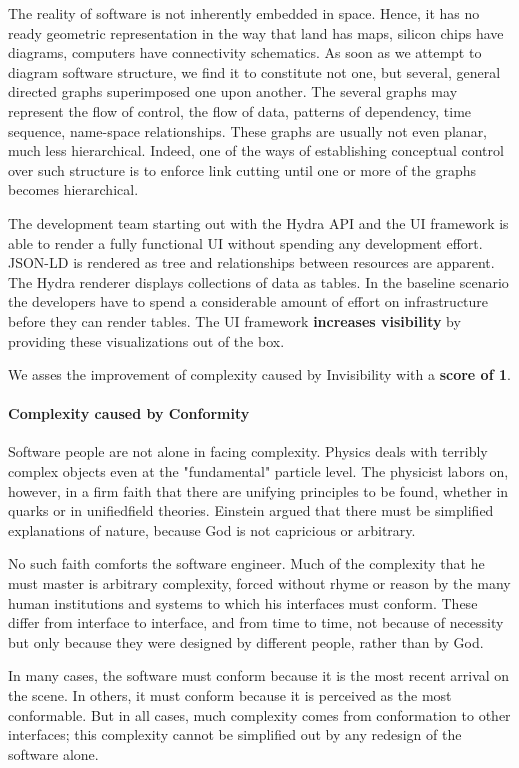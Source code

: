 The reality of software is not inherently embedded in space. Hence, it has no ready geometric representation in the way that land has maps, silicon chips have diagrams, computers have connectivity schematics. As soon as we attempt to diagram software structure, we find it to constitute not one, but several, general directed graphs superimposed one upon another. The several graphs may represent the flow of control, the flow of data, patterns of dependency, time sequence, name-space relationships. These graphs are usually not even planar, much less hierarchical. Indeed, one of the ways of establishing conceptual control over such structure is to enforce link cutting until one or more of the graphs becomes hierarchical. \citep{nosilverbullet}

The development team starting out with the Hydra API and the UI framework is able to render a fully functional UI without spending any development effort. JSON-LD is rendered as tree and relationships between resources are apparent. The Hydra renderer displays collections of data as tables. In the baseline scenario the developers have to spend a considerable amount of effort on infrastructure before they can render tables. The UI framework \textbf{increases visibility} by providing these visualizations out of the box.

We asses the improvement of complexity caused by Invisibility with a \textbf{score of 1}.

\paragraph{Complexity caused by Conformity}
Software people are not alone in facing complexity. Physics deals with terribly complex objects even at the "fundamental" particle level. The physicist labors on, however, in a firm faith that there are unifying principles to be found, whether in quarks or in unifiedfield theories. Einstein argued that there must be simplified explanations of nature, because God is not capricious or arbitrary.

No such faith comforts the software engineer. Much of the complexity that he must master is arbitrary complexity, forced without rhyme or reason by the many human institutions and systems to which his interfaces must conform. These differ from interface to interface, and from time to time, not because of necessity but only because they were designed by different people, rather than by God.

In many cases, the software must conform because it is the most recent arrival on the scene. In others, it must conform because it is perceived as the most conformable. But in all cases, much complexity comes from conformation to other interfaces; this complexity cannot be simplified out by any redesign of the software alone. \citep{nosilverbullet}

